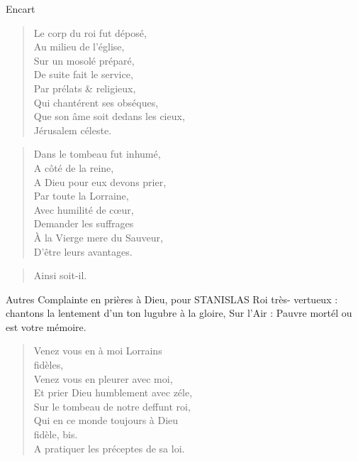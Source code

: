 \begin{diary}{Encart}{}
        \begin{verse}Le corp du roi fut déposé,\\Au milieu de l’église,\\Sur un mosolé préparé,\\De suite fait le service,\\Par prélats & religieux,\\Qui chantérent ses obséques,\\Que son âme soit dedans les cieux,\\Jérusalem céleste.\\\end{verse}
        \bigskip
        
        \begin{verse}Dans le tombeau fut inhumé,\\A côté de la reine,\\A Dieu pour eux devons prier,\\Par toute la Lorraine,\\Avec humilité de cœur,\\Demander les suffrages\\À la Vierge mere du Sauveur,\\D'être leurs avantages.\\\end{verse}
        \bigskip
        
        \begin{verse}Ainsi soit-il.\\\end{verse}
        \bigskip
        
         Autres Complainte en prières à Dieu, pour STANISLAS Roi très-
                              vertueux : chantons la lentement d’un ton lugubre à la gloire,
                              Sur l'Air :
                              Pauvre mortél ou est votre mémoire. \bigskip
        
        \begin{verse}Venez vous en à moi Lorrains\\fidèles,\\Venez vous en pleurer avec moi,\\Et prier Dieu humblement avec zéle,\\Sur le tombeau de notre deffunt
                                    roi,\\Qui en ce monde toujours à Dieu\\fidèle, bis.\\A pratiquer les préceptes de sa loi.\\\end{verse}
        \bigskip
        

\end{diary}
